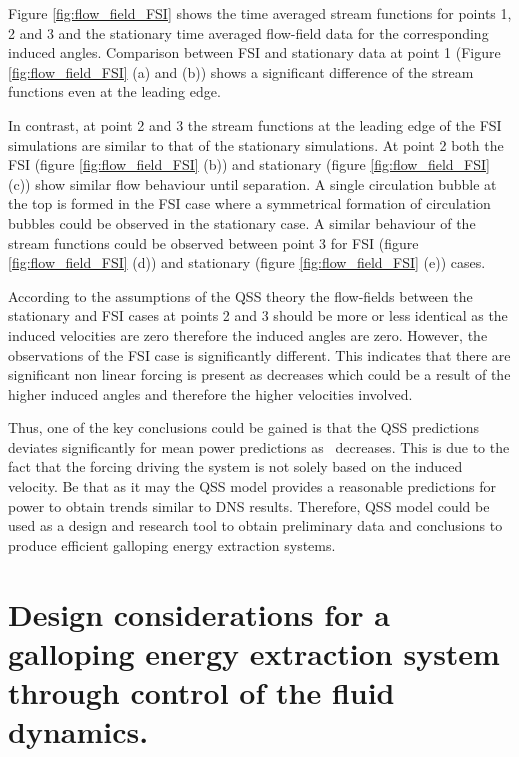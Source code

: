 

Figure \ref{fig:flow_field_FSI} shows the time averaged stream functions for points 1, 2 and 3 and the stationary time averaged flow-field data for the corresponding induced angles. Comparison between FSI and stationary data at point 1 (Figure \ref{fig:flow_field_FSI} (a) and (b)) shows a significant difference of the stream functions even at the leading edge.

In contrast, at point 2 and 3 the stream functions at the leading edge of the FSI simulations are similar to that of the stationary simulations. At point 2 both the FSI (figure \ref{fig:flow_field_FSI} (b)) and stationary (figure \ref{fig:flow_field_FSI} (c)) show similar flow behaviour until separation. A single circulation bubble at the top is formed in the FSI case where a symmetrical formation of circulation bubbles could be observed in the stationary case. A similar behaviour of the stream functions could be observed between point 3 for FSI (figure \ref{fig:flow_field_FSI} (d)) and stationary (figure \ref{fig:flow_field_FSI} (e)) cases. 

According to the assumptions of the QSS theory the flow-fields between the stationary and FSI cases at points 2 and 3 should be more or less identical as the induced velocities are zero therefore the induced angles are zero. However, the observations of the FSI case is significantly different. This indicates that there are significant non linear forcing is present as \ratio decreases which could be a result of the higher induced angles and therefore the higher velocities involved. 

Thus, one of the key conclusions could be gained is that the QSS predictions deviates significantly for mean power predictions as \ratio\ decreases. This is due to the fact that the forcing driving the system is not solely based on the induced velocity. Be that as it may the QSS model provides a reasonable predictions for power to obtain trends similar to DNS results. Therefore, QSS model could be used as a design and research tool to obtain preliminary data and conclusions to produce efficient galloping energy extraction systems. 

\section{Design considerations for a galloping energy extraction system through control of the fluid dynamics.}
\label{subsec:design-considerations-cross-section}
  
